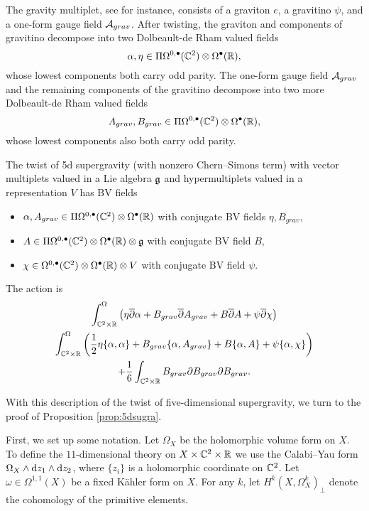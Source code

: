 The gravity multiplet, see \cite{CCDF} for instance, consists of a graviton $e$, a gravitino $\psi$, and a one-form gauge field $\mathcal A_{grav}$.
After twisting, the graviton and components of gravitino decompose into two Dolbeault-de Rham valued fields 
\[
\alpha, \eta \in \Pi \Omega^{0,\bullet}(\mathbb C^2) \otimes \Omega^\bullet(\mathbb R) ,
\]
whose lowest components both carry odd parity. 
The one-form gauge field $\mathcal A_{grav}$ and the remaining components of the gravitino decompose into two more Dolbeault-de Rham valued fields
\[
A_{grav} , B_{grav} \in \Pi \Omega^{0,\bullet}(\mathbb C^2) \otimes \Omega^\bullet(\mathbb R) ,
\]
whose lowest components also both carry odd parity. 

\begin{conj}
\label{conj:5dsugra}
The twist of 5d supergravity (with nonzero Chern--Simons term) with vector multiplets valued in a Lie algebra $\mathfrak g$ and hypermultiplets valued in a representation $V$ has BV fields
\begin{itemize}
\item $\alpha, A_{grav} \in \Pi \Omega^{0,\bullet}(\mathbb C^2) \otimes \Omega^\bullet(\mathbb R)$ with conjugate BV fields $\eta, B_{grav}$,
\item $A \in \Pi \Omega^{0,\bullet}(\mathbb C^2) \otimes \Omega^\bullet(\mathbb R) \otimes \mathfrak g$ with conjugate BV field $B$,
\item $\chi \in \Omega^{0,\bullet}(\mathbb C^2) \otimes \Omega^\bullet(\mathbb R) \otimes V$ with conjugate BV field $\psi$.
\end{itemize}

The action is
\begin{multline}
\label{eqn:5daction} 
\int^\Omega_{\mathbb C^2 \times \mathbb R} \left(\eta \overline{\partial} \alpha + B_{grav} \overline{\partial} A_{grav} + B \overline{\partial} A + \psi \overline{\partial} \chi \right) \\
  \int^\Omega_{\mathbb C^2 \times \mathbb R} \left( \frac12\eta \{\alpha, \alpha\} +  B_{grav} \{\alpha, A_{grav}\}+ B \{\alpha, A\} +  \psi \{\alpha, \chi \}\right) \\ 
+ \frac16 \int_{\mathbb C^2 \times \mathbb R} B_{grav} \partial B_{grav} \partial B_{grav} .
\end{multline}
\end{conj}


\parsec[-]

With this description of the twist of five-dimensional supergravity, we turn to the proof of Proposition \ref{prop:5dsugra}. 

First, we set up some notation. 
Let $\Omega_X$ be the holomorphic volume form on $X$. 
To define the $11$-dimensional theory on $X \times \mathbb C^2 \times \mathbb R$ we use the Calabi--Yau form $\Omega_X \wedge {\rm d} z_1 \wedge {\rm d} z_2$, where $\{z_i\}$ is a holomorphic coordinate on $\mathbb C^2$. 
Let $\omega \in \Omega^{1,1}(X)$ be a fixed K\"ahler form on $X$.
For any $k$, let $H^k(X, \Omega^k_X)_\perp$ denote the cohomology of the primitive elements. 


